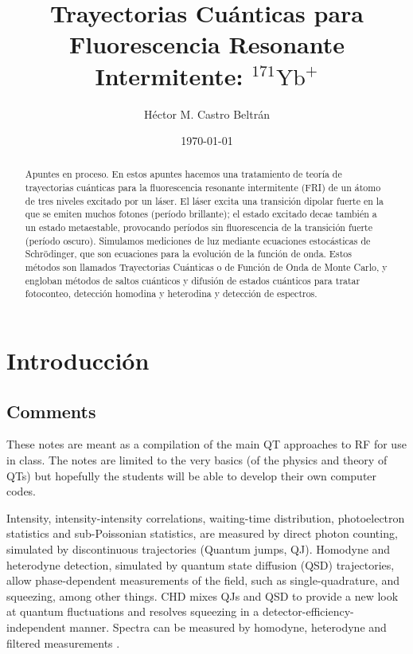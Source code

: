 \documentclass[twocolumn,aps,eqsecnum,showkeys,amsmath]{revtex4}
\begin{document}
\title{Trayectorias Cu\'anticas para Fluorescencia Resonante Intermitente: 
$^{171} \mathrm{Yb}^+$}
\author{H\'ector M. Castro Beltr\'an}

\date{\today}
\begin{abstract} 
Apuntes en proceso. En estos apuntes hacemos una tratamiento de teor\'ia 
de trayectorias cu\'anticas para la fluorescencia resonante intermitente (FRI) 
de un \'atomo de tres niveles excitado por un l\'aser. El l\'aser excita una 
transici\'on dipolar fuerte en la que se emiten muchos fotones (per\'iodo 
brillante); el estado excitado decae tambi\'en a un estado metaestable, 
provocando per\'iodos sin fluorescencia de la transici\'on fuerte (per\'iodo 
oscuro).  Simulamos mediciones de luz mediante ecuaciones estoc\'asticas 
de Schr\"odinger, que son ecuaciones para la evoluci\'on de la funci\'on de 
onda. Estos m\'etodos son llamados Trayectorias Cu\'anticas o de Funci\'on 
de Onda de Monte Carlo, y engloban m\'etodos de saltos cu\'anticos y 
difusi\'on de estados cu\'anticos para tratar fotoconteo, detecci\'on homodina 
y heterodina y  detecci\'on de espectros. 
\end{abstract}

\maketitle

\section{Introducci\'on}
\subsection{Comments}
These notes are meant as a compilation of the main QT approaches to RF 
for use in class. The notes are limited to the very basics (of the physics and 
theory of QTs) but hopefully the students will be able to develop their own 
computer codes. 

Intensity, intensity-intensity correlations, waiting-time distribution, 
photoelectron statistics and sub-Poissonian statistics, are measured by 
direct photon counting, simulated by discontinuous trajectories (Quantum 
jumps, QJ). 
Homodyne and heterodyne detection, simulated by quantum state diffusion 
(QSD) trajectories, allow phase-dependent measurements of the field, such 
as single-quadrature, and squeezing, among other things. CHD mixes QJs 
and QSD to provide a new look at quantum fluctuations and resolves 
squeezing in a detector-efficiency-independent manner. Spectra can be 
measured by homodyne, heterodyne and filtered measurements 
\cite{TiCa92,Holl97}. 
\end{document}
